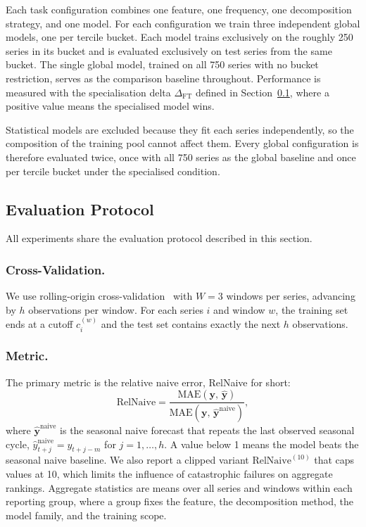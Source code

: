 \documentclass[pdflatex,sn-mathphys-num]{sn-jnl}
\theoremstyle{thmstyleone}
\theoremstyle{thmstyletwo}
\theoremstyle{thmstylethree}
\begin{document}
Each task configuration combines one feature, one frequency, one decomposition
strategy, and one model. For each configuration we train three independent
global models, one per tercile bucket. Each model trains exclusively on the
roughly 250 series in its bucket and is evaluated exclusively on test series
from the same bucket. The single global model, trained on all 750 series with
no bucket restriction, serves as the comparison baseline throughout.
Performance is measured with the specialisation delta $\Delta_{\mathrm{FT}}$
defined in Section~\ref{sec:evaluation}, where a positive value means the
specialised model wins.

Statistical models are excluded because they fit each series independently, so
the composition of the training pool cannot affect them. Every global
configuration is therefore evaluated twice, once with all 750 series as the
global baseline and once per tercile bucket under the specialised condition.

\subsection{Evaluation Protocol}\label{sec:evaluation}

All experiments share the evaluation protocol described in this section.

\subsubsection{Cross-Validation.}
We use rolling-origin cross-validation~\cite{tashman2000} with $W = 3$ windows
per series, advancing by $h$ observations per window. For each series $i$ and
window $w$, the training set ends at a cutoff $c_i^{(w)}$ and the test set
contains exactly the next $h$ observations.

\subsubsection{Metric.}
The primary metric is the relative naive error, RelNaive for short:
\begin{equation}
  \mathrm{RelNaive} =
    \frac{\mathrm{MAE}(\mathbf{y},\,\hat{\mathbf{y}})}
         {\mathrm{MAE}(\mathbf{y},\,\hat{\mathbf{y}}^{\mathrm{naive}})},
  \label{eq:relnai}
\end{equation}
where $\hat{\mathbf{y}}^{\mathrm{naive}}$ is the seasonal naive forecast that
repeats the last observed seasonal cycle,
$\hat{y}_{t+j}^{\mathrm{naive}} = y_{t+j-m}$ for $j = 1, \ldots, h$. A value
below 1 means the model beats the seasonal naive baseline. We also report a
clipped variant $\mathrm{RelNaive}^{(10)}$ that caps values at 10, which
limits the influence of catastrophic failures on aggregate rankings. Aggregate
statistics are means over all series and windows within each reporting group,
where a group fixes the feature, the decomposition method, the model family,
and the training scope.
\end{document}
